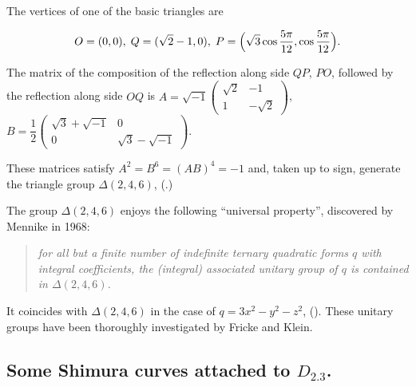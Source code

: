 \begin{para}\label{para::6.1.2} The vertices of one of the basic triangles are

\begin{equation*}
 O=(0,0),\;Q=(\sqrt 2 -1, 0),\;P=\Bigl(\sqrt 3 \cos
 \frac{5\pi}{12}, \cos \frac{5\pi}{12}\Bigr).
\end{equation*}

\medskip\noindent
The matrix of the composition of the reflection along side $QP$, \resp
$PO$, followed by the reflection 
along side $OQ$ is $A=\sqrt {-1}\begin{pmatrix}\sqrt 2 & -1 \\1 &-\sqrt 2
\end{pmatrix}$, \resp  $B=\dfrac{1}{2}\begin{pmatrix}\sqrt 3 +\sqrt
{-1} & 0 \\0 & \sqrt 3 -\sqrt {-1}
\end{pmatrix}$. 

\noindent These matrices satisfy $A^2=B^6=(AB)^4=-1$ and, taken up to
 sign, generate the triangle group $\Delta(2,4,6)$, 
 (\cf \cite[II5]{ntatg}.)
\end{para}


\begin{para}\label{para::6.1.3} The group $\Delta(2,4,6)$ enjoys the following
 ``universal property'', discovered by Mennike in 1968: 

\begin{quote}
 {\it for all but a finite number of indefinite ternary quadratic forms
 $q$ with integral coefficients, the 
 (integral) associated unitary group of $q$ is contained in $\Delta(2,4,6)$.}
\end{quote}

 \noindent It coincides with $\Delta(2,4,6)$ in the case of
 $q=3x^2-y^2-z^2$, (\cf \cite[III3]{ntatg}).  These unitary groups
 have been thoroughly investigated by Fricke and Klein.
\end{para}

\subsection{Some Shimura curves attached to $D_{2.3}$.}\label{sub::6.2}

